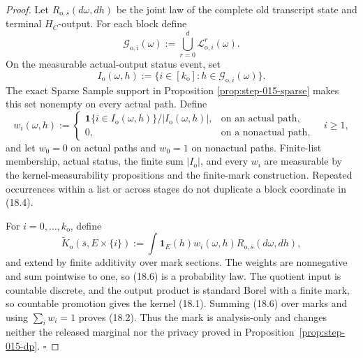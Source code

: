 \begin{proof}
Let \(R_{\mathrm o,\bar s}(d\omega,dh)\) be the joint law of the complete
old transcript state and terminal \(H_C\)-output. For each block define
\[
\mathcal G_{\mathrm o,i}(\omega):=
\bigcup_{r=0}^d\mathcal L_{\mathrm o,i}^r(\omega).
\tag{18.3}
\]
On the measurable actual-output status event, set
\[
I_{\mathrm o}(\omega,h):=
\{i\in[k_{\mathrm o}]:h\in\mathcal G_{\mathrm o,i}(\omega)\}.
\tag{18.4}
\]
The exact Sparse Sample support in Proposition
\ref{prop:step-015-sparse} makes this set nonempty on every actual path.
Define
\[
w_i(\omega,h):=
\begin{cases}
\mathbf1\{i\in I_{\mathrm o}(\omega,h)\}/|I_{\mathrm o}(\omega,h)|,
&\text{on an actual path},\\
0,&\text{on a nonactual path},
\end{cases}
\quad i\ge1,
\tag{18.5}
\]
and let \(w_0=0\) on actual paths and \(w_0=1\) on nonactual paths.
Finite-list membership, actual status, the finite sum
\(|I_{\mathrm o}|\), and every \(w_i\) are measurable by the
kernel-measurability propositions and the finite-mark construction.
Repeated occurrences within a list or across stages do not duplicate a
block coordinate in (18.4).

For \(i=0,\ldots,k_{\mathrm o}\), define
\[
\widetilde K_{\mathrm o}(\bar s,E\times\{i\})
:=\int\mathbf1_E(h)w_i(\omega,h)
R_{\mathrm o,\bar s}(d\omega,dh),
\tag{18.6}
\]
and extend by finite additivity over mark sections. The weights are
nonnegative and sum pointwise to one, so (18.6) is a probability law.
The quotient input is countable discrete, and the output product is
standard Borel with a finite mark, so  countable promotion gives
the kernel (18.1). Summing (18.6) over marks and using
\(\sum_iw_i=1\) proves (18.2). Thus the mark is analysis-only and changes
neither the released marginal nor the privacy proved in
Proposition~\ref{prop:step-015-dp}. \(\square\)


\end{proof}

